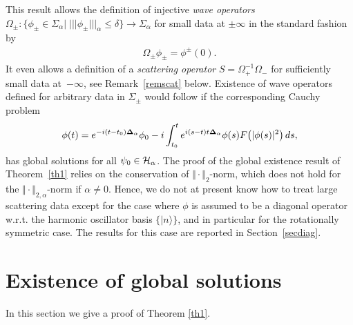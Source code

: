 \documentclass[10pt,a4paper]{amsart}
\begin{document}
This result allows the def\/inition of injective {\it wave operators}
$\Omega_{\pm}: \{\phi_\pm\in\Sigma_{\alpha}|\;
|||\phi_\pm|||_\alpha\leq\delta\} \to\Sigma_{\alpha}$ for small data
at $\pm\infty$ in the standard fashion by
\begin{gather}\label{waveop}
\Omega_{\pm}\phi_\pm = \phi^\pm(0) .
\end{gather}
It even allows a def\/inition of a {\it scattering operator}
$S=\Omega_+^{-1}\Omega_-$ for suf\/f\/iciently small data at~$-\infty$,
see Remark~\ref{remscat} below. Existence of wave operators def\/ined
for arbitrary data in
$\Sigma_\pm$ would follow if the corresponding Cauchy problem
\begin{gather*}
\phi(t) = e^{-i(t-t_0){\bf\Delta}_\alpha}\phi_0 - i\int_{t_0}^t
e^{i(s-t)t{\bf\Delta}_\alpha}\phi(s) F\big(|\phi(s)|^2\big)\,ds ,
\end{gather*}
 has global solutions for all $\psi_0\in{\cal H}_\alpha$. The proof of
the global existence result of Theorem~\ref{th1} relies on the
conservation of $\Vert\cdot\Vert_2$-norm, which does not hold for the
$\Vert\cdot\Vert_{2,\alpha}$-norm if $\alpha\neq 0$. Hence, we do not at
present know how to treat large scattering data except for the case where
 $\phi$ is assumed to be a diagonal operator w.r.t. the harmonic
oscillator basis $\{|n\rangle\}$, and in particular for the
rotationally symmetric case. The results for this case are reported in
 Section~\ref{secdiag}.


\section{Existence of global solutions}
\label{secth1}

In this section we give a proof of Theorem \ref{th1}.
\end{document}
